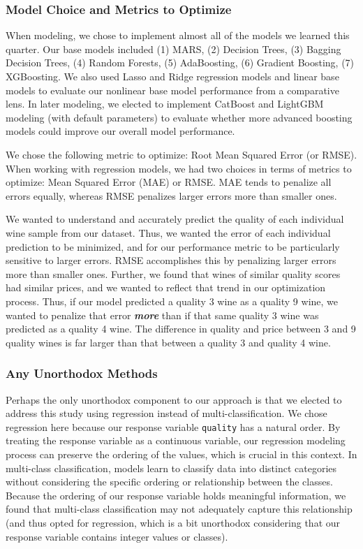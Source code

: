 \documentclass[
  letterpaper,
  DIV=11,
  numbers=noendperiod]{scrartcl}
\begin{document}
\hypertarget{model-choice-and-metrics-to-optimize}{%
\subsubsection{Model Choice and Metrics to
Optimize}\label{model-choice-and-metrics-to-optimize}}

When modeling, we chose to implement almost all of the models we learned
this quarter. Our base models included (1) MARS, (2) Decision Trees, (3)
Bagging Decision Trees, (4) Random Forests, (5) AdaBoosting, (6)
Gradient Boosting, (7) XGBoosting. We also used Lasso and Ridge
regression models and linear base models to evaluate our nonlinear base
model performance from a comparative lens. In later modeling, we elected
to implement CatBoost and LightGBM modeling (with default parameters) to
evaluate whether more advanced boosting models could improve our overall
model performance.

We chose the following metric to optimize: Root Mean Squared Error (or
RMSE). When working with regression models, we had two choices in terms
of metrics to optimize: Mean Squared Error (MAE) or RMSE. MAE tends to
penalize all errors equally, whereas RMSE penalizes larger errors more
than smaller ones.

We wanted to understand and accurately predict the quality of each
individual wine sample from our dataset. Thus, we wanted the error of
each individual prediction to be minimized, and for our performance
metric to be particularly sensitive to larger errors. RMSE accomplishes
this by penalizing larger errors more than smaller ones. Further, we
found that wines of similar quality scores had similar prices, and we
wanted to reflect that trend in our optimization process. Thus, if our
model predicted a quality 3 wine as a quality 9 wine, we wanted to
penalize that error \textbf{\emph{more}} than if that same quality 3
wine was predicted as a quality 4 wine. The difference in quality and
price between 3 and 9 quality wines is far larger than that between a
quality 3 and quality 4 wine.

\hypertarget{any-unorthodox-methods}{%
\subsubsection{Any Unorthodox Methods}\label{any-unorthodox-methods}}

Perhaps the only unorthodox component to our approach is that we elected
to address this study using regression instead of multi-classification.
We chose regression here because our response variable \texttt{quality}
has a natural order. By treating the response variable as a continuous
variable, our regression modeling process can preserve the ordering of
the values, which is crucial in this context. In multi-class
classification, models learn to classify data into distinct categories
without considering the specific ordering or relationship between the
classes. Because the ordering of our response variable holds meaningful
information, we found that multi-class classification may not adequately
capture this relationship (and thus opted for regression, which is a bit
unorthodox considering that our response variable contains integer
values or classes).
\end{document}

